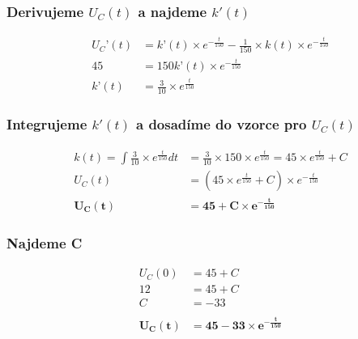 \subsubsection{Derivujeme $U_C(t)$ a najdeme $k'(t)$}
\begin{align*}
U_C’(t) &= k’(t) \times  e^{-\frac{t}{150} } - \frac {1}{150} \times  k(t) \times  e^{-\frac{t}{150}}\\
45 &= 150k’(t) \times  e^{-\frac{t}{150}}\\
k’(t) &= \frac {3}{10} \times  e^{\frac{t}{150}}
\end{align*}
\subsubsection{Integrujeme $k'(t)$ a dosadíme do vzorce pro $U_C(t)$}
\begin{align*}
k(t) = \int \frac {3}{10} \times  e^{\frac{t}{150}} dt &= \frac{3}{10} \times 150 \times e^{\frac{t}{150}} = 45 \times  e^{\frac{t}{150}} + C\\
U_C(t) &= (45 \times e^{\frac{t}{150}} + C) \times  e^{-\frac{t}{150}}\\
\boldsymbol{U_C(t) }&=\boldsymbol{ 45 + C \times  e^{-\frac{t}{150}} }
\end{align*}
\subsubsection{Najdeme C}
\begin{align*}
U_C(0) &= 45 + C\\
12 &= 45 + C\\
C &= -33\\ \\
\boldsymbol{U_C(t) }&=\boldsymbol{ 45 - 33 \times  e^{-\frac{t}{150}} }
\end{align*}